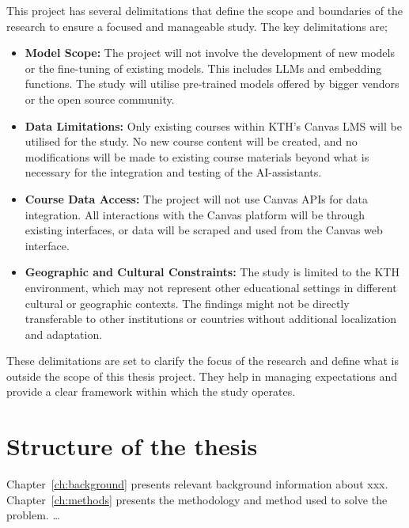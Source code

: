 This project has several delimitations that define the scope and boundaries of the research to ensure a focused and manageable study. The key delimitations are;

\begin{itemize}
	\item \textbf{Model Scope:} The project will not involve the development of new models or the fine-tuning of existing models. This includes LLMs and embedding functions. The study will utilise pre-trained models offered by bigger vendors or the open source community.
	\item \textbf{Data Limitations:} Only existing courses within KTH’s Canvas LMS will be utilised for the study. No new course content will be created, and no modifications will be made to existing course materials beyond what is necessary for the integration and testing of the AI-assistants.
	\item \textbf{Course Data Access:} The project will not use Canvas APIs for data integration. All interactions with the Canvas platform will be through existing interfaces, or data will be scraped and used from the Canvas web interface.
	\item \textbf{Geographic and Cultural Constraints:} The study is limited to the KTH environment, which may not represent other educational settings in different cultural or geographic contexts. The findings might not be directly transferable to other institutions or countries without additional localization and adaptation.
\end{itemize}

These delimitations are set to clarify the focus of the research and define what is outside the scope of this thesis project. They help in managing expectations and provide a clear framework within which the study operates.



\section{Structure of the thesis}


Chapter~\ref{ch:background} presents relevant background information about xxx.  Chapter~\ref{ch:methods} presents the methodology and method used to solve the problem. …

\cleardoublepage

